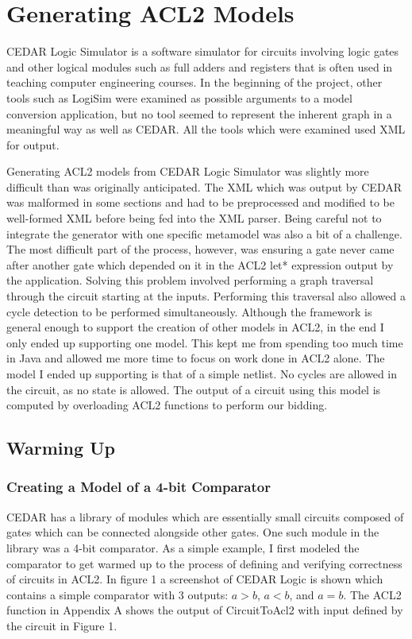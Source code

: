 \documentclass[fleqn,10pt]{SelfArx} %
\begin{document}

\section{Generating ACL2 Models}
CEDAR Logic Simulator is a software simulator for circuits involving logic gates and other logical modules such as full adders and registers that is often used in teaching computer engineering courses. In the beginning of the project, other tools such as LogiSim were examined as possible arguments to a model conversion application, but no tool seemed to represent the inherent graph in a meaningful way as well as CEDAR. All the tools which were examined used XML for output.

Generating ACL2 models from CEDAR Logic Simulator was slightly more difficult than was originally anticipated. The XML which was output by CEDAR was malformed in some sections and had to be preprocessed and modified to be well-formed XML before being fed into the XML parser. Being careful not to integrate the generator with one specific metamodel was also a bit of a challenge. The most difficult part of the process, however, was ensuring a gate never came after another gate which depended on it in the ACL2 let* expression output by the application. Solving this problem involved performing a graph traversal through the circuit starting at the inputs. Performing this traversal also allowed a cycle detection to be performed simultaneously. Although the framework is general enough to support the creation of other models in ACL2, in the end I only ended up supporting one model. This kept me from spending too much time in Java and allowed me more time to focus on work done in ACL2 alone. The model I ended up supporting is that of a simple netlist. No cycles are allowed in the circuit, as no state is allowed. The output of a circuit using this model is computed by overloading ACL2 functions to perform our bidding.

\subsection{Warming Up}
\subsubsection{Creating a Model of a 4-bit Comparator}
CEDAR has a library of modules which are essentially small circuits composed of gates which can be connected alongside other gates. One such module in the library was a 4-bit comparator. As a simple example, I first modeled the comparator to get warmed up to the process of defining and verifying correctness of circuits in ACL2. In figure 1 a screenshot of CEDAR Logic is shown which contains a simple comparator with 3 outputs: $a>b$, $a<b$, and $a=b$. The ACL2 function in Appendix A shows the output of CircuitToAcl2 with input defined by the circuit in Figure 1.
\end{document}
